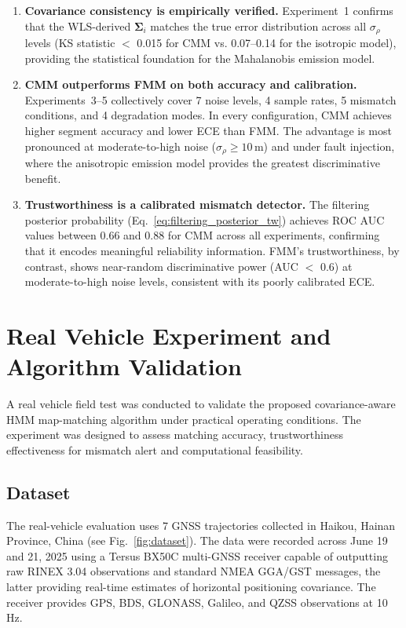 \documentclass[letterpaper,journal]{IEEEtran}
\begin{document}
\begin{enumerate}
\item \textbf{Covariance consistency is empirically verified.} Experiment~1 confirms that the WLS-derived $\boldsymbol{\Sigma}_i$ matches the true error distribution across all $\sigma_{\rho}$ levels (KS statistic $<$ 0.015 for CMM vs. 0.07--0.14 for the isotropic model), providing the statistical foundation for the Mahalanobis emission model.

\item \textbf{CMM outperforms FMM on both accuracy and calibration.} Experiments~3--5 collectively cover 7 noise levels, 4 sample rates, 5 mismatch conditions, and 4 degradation modes. In every configuration, CMM achieves higher segment accuracy and lower ECE than FMM. The advantage is most pronounced at moderate-to-high noise ($\sigma_{\rho} \ge 10$\,m) and under fault injection, where the anisotropic emission model provides the greatest discriminative benefit.

\item \textbf{Trustworthiness is a calibrated mismatch detector.} The filtering posterior probability (Eq.~\eqref{eq:filtering_posterior_tw}) achieves ROC AUC values between 0.66 and 0.88 for CMM across all experiments, confirming that it encodes meaningful reliability information. FMM's trustworthiness, by contrast, shows near-random discriminative power (AUC $<$ 0.6) at moderate-to-high noise levels, consistent with its poorly calibrated ECE.
\end{enumerate}

\section{Real Vehicle Experiment and Algorithm Validation}
\label{sec:real-experiment}

A real vehicle field test was conducted to validate the proposed covariance-aware 
HMM map-matching algorithm under practical operating conditions. The experiment 
was designed to assess matching accuracy, trustworthiness effectiveness for mismatch alert and computational feasibility.

\subsection{Dataset}
The real-vehicle evaluation uses 7 GNSS trajectories collected in Haikou,
Hainan Province, China (see Fig.~\ref{fig:dataset}). The data were recorded across
June 19 and 21, 2025 using a Tersus BX50C multi-GNSS receiver capable of
outputting raw RINEX 3.04 observations and standard NMEA GGA/GST messages,
the latter providing real-time estimates of horizontal positioning covariance.
The receiver provides GPS, BDS, GLONASS, Galileo, and QZSS observations at
10\,Hz.
\end{document}
